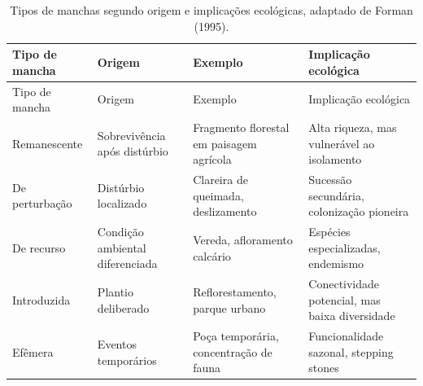 \documentclass[
  portuguese,
  11pt,
  a4paper,
  open=any]{scrbook}
\begin{document}
\begin{longtable}[]{@{}
  >{\raggedright\arraybackslash}p{}
  >{\raggedright\arraybackslash}p{}
  >{\raggedright\arraybackslash}p{}
  >{\raggedright\arraybackslash}p{}@{}}
\caption{Tipos de manchas segundo origem e implicações ecológicas,
adaptado de Forman (1995).}\label{tbl-tipos-manchas}\tabularnewline
\toprule\noalign{}
\begin{minipage}[b]{\linewidth}\raggedright
Tipo de mancha
\end{minipage} & \begin{minipage}[b]{\linewidth}\raggedright
Origem
\end{minipage} & \begin{minipage}[b]{\linewidth}\raggedright
Exemplo
\end{minipage} & \begin{minipage}[b]{\linewidth}\raggedright
Implicação ecológica
\end{minipage} \\
\midrule\noalign{}
\endfirsthead
\toprule\noalign{}
\begin{minipage}[b]{\linewidth}\raggedright
Tipo de mancha
\end{minipage} & \begin{minipage}[b]{\linewidth}\raggedright
Origem
\end{minipage} & \begin{minipage}[b]{\linewidth}\raggedright
Exemplo
\end{minipage} & \begin{minipage}[b]{\linewidth}\raggedright
Implicação ecológica
\end{minipage} \\
\midrule\noalign{}
\endhead
\bottomrule\noalign{}
\endlastfoot
Remanescente & Sobrevivência após distúrbio & Fragmento florestal em
paisagem agrícola & Alta riqueza, mas vulnerável ao isolamento \\
De perturbação & Distúrbio localizado & Clareira de queimada,
deslizamento & Sucessão secundária, colonização pioneira \\
De recurso & Condição ambiental diferenciada & Vereda, afloramento
calcário & Espécies especializadas, endemismo \\
Introduzida & Plantio deliberado & Reflorestamento, parque urbano &
Conectividade potencial, mas baixa diversidade \\
Efêmera & Eventos temporários & Poça temporária, concentração de fauna &
Funcionalidade sazonal, stepping stones \\
\end{longtable}
\end{document}
